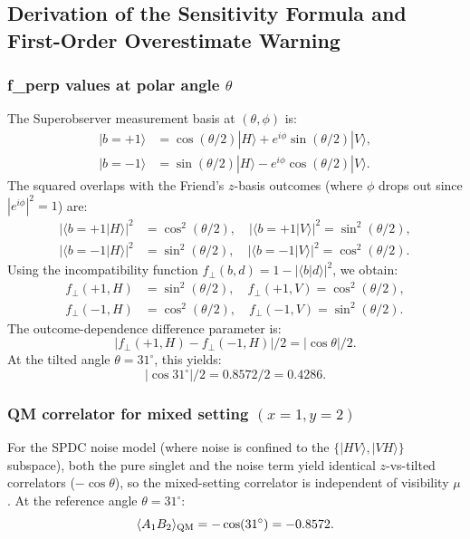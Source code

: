 \documentclass[12pt]{article}
\begin{document}
\subsection{Derivation of the Sensitivity Formula and First-Order Overestimate Warning}
\label{sec:S2_derivation}

\subsubsection{f\_perp values at polar angle $\theta$}
The Superobserver measurement basis at $(\theta, \phi)$ is:
\begin{align}
|b=+1\rangle &= \cos(\theta/2)|H\rangle + e^{i\phi}\sin(\theta/2)|V\rangle,\\
|b=-1\rangle &= \sin(\theta/2)|H\rangle - e^{i\phi}\cos(\theta/2)|V\rangle.
\end{align}
The squared overlaps with the Friend's $z$-basis outcomes (where $\phi$ drops out since $|e^{i\phi}|^2 = 1$) are:
\begin{align}
|\langle b=+1|H\rangle|^2 &= \cos^2(\theta/2), \quad |\langle b=+1|V\rangle|^2 = \sin^2(\theta/2),\\
|\langle b=-1|H\rangle|^2 &= \sin^2(\theta/2), \quad |\langle b=-1|V\rangle|^2 = \cos^2(\theta/2).
\end{align}
Using the incompatibility function $f_\perp(b,d) = 1 - |\langle b|d\rangle|^2$, we obtain:
\begin{align}
f_\perp(+1,H) &= \sin^2(\theta/2), \quad f_\perp(+1,V) = \cos^2(\theta/2),\\
f_\perp(-1,H) &= \cos^2(\theta/2), \quad f_\perp(-1,V) = \sin^2(\theta/2).
\end{align}
The outcome-dependence difference parameter is:
\begin{equation}
|f_\perp(+1,H) - f_\perp(-1,H)|/2 = |\cos\theta|/2.
\end{equation}
At the tilted angle $\theta = 31^\circ$, this yields:
\begin{equation}
|\cos 31^\circ|/2 = 0.8572/2 = 0.4286.
\end{equation}

\subsubsection{QM correlator for mixed setting $(x=1, y=2)$}
For the SPDC noise model (where noise is confined to the $\{|HV\rangle, |VH\rangle\}$ subspace), both the pure singlet and the noise term yield identical $z$-vs-tilted correlators ($-\cos\theta$), so the mixed-setting correlator is independent of visibility $\mu$. At the reference angle $\theta = 31^\circ$:
\begin{equation}
\langle A_1 B_2 \rangle_{\rm QM} = -\cos(31^\circ) = -0.8572.
\end{equation}
\end{document}
